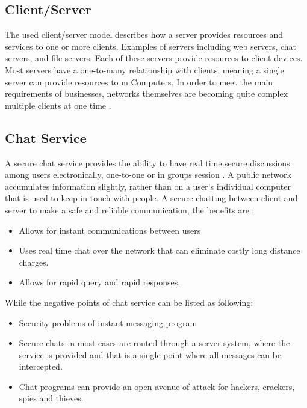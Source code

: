 \subsection{Client/Server}
The used client/server model describes how
a server provides resources and services to one or
more clients. Examples of servers including web servers, chat
servers, and file servers. Each of these servers provide
resources to client devices. Most servers have a one-to-many
relationship with clients, meaning a single server can provide
resources to m Computers. In order to meet the main
requirements of businesses, networks themselves are
becoming quite complex multiple clients at one time .\cite{sonmez2017development}\\

\subsection{Chat Service}
A secure chat service provides the ability to have real time
secure discussions among users electronically, one-to-one or
in groups session . A public network accumulates
information slightly, rather than on a user’s individual
computer that is used to keep in touch with people.\cite{sonmez2017development} A secure
chatting between client and server to make a safe and reliable
communication, the benefits are :
\vspace{-18pt}
\begin{itemize}
	\item Allows for instant communications between users
	\item Uses real time chat over the network that can
	      eliminate costly long distance charges.
	\item Allows for rapid query and rapid responses.
\end{itemize}
While the negative points of chat service can be listed as
following:
\vspace{-18pt}
\begin{itemize}
	\item Security problems of instant messaging program
	\item Secure chats in most cases are routed through a
	      server system, where the service is provided and that is a
	      single point where all messages can be intercepted.
	\item Chat programs can provide an open avenue of
	      attack for hackers, crackers, spies and thieves.
\end{itemize}

